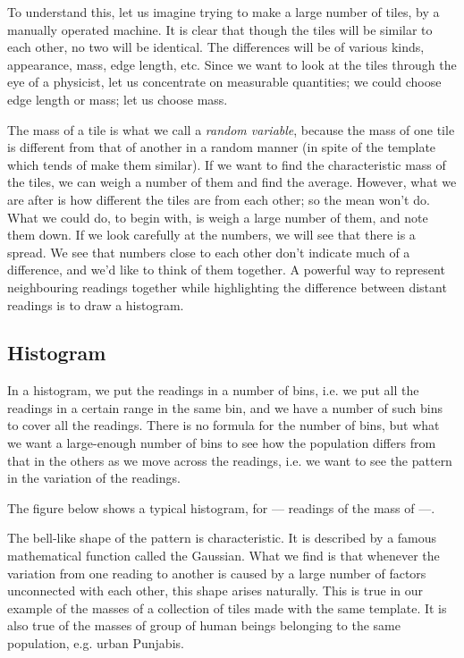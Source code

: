 To understand this, let us imagine trying to make a large number of tiles, by a manually operated machine. It is clear that though the tiles will be similar to each other, no two will be identical. The differences will be of various kinds, appearance, mass, edge length, etc. Since we want to look at the tiles through the eye of a physicist, let us concentrate on measurable quantities; we could choose edge length or mass; let us choose mass. 

The mass of a tile is what we call a \textit{random variable}, because the mass of one tile is different from that of another in a random manner (in spite of the template which tends of make them similar). If we want to find the characteristic mass of the tiles, we can weigh a number of them and find the average. However, what we are after is how different the tiles are from each other; so the mean won't do. What we could do, to begin with, is weigh a large number of them, and note them down. If we look carefully at the numbers, we will see that there is a spread. We see that numbers close to each other don't indicate much of a difference, and we'd like to think of them together. A powerful way to represent neighbouring readings together while highlighting the difference between distant readings is to draw a histogram. 
\subsection{Histogram}

In a histogram, we put the readings in a number of bins, i.e. we put all the readings in a certain range in the same bin, and we have a number of such bins to cover all the readings. There is no formula for the number of bins, but what we want a large-enough number of bins to see how the population differs from that in the others as we move across the readings, i.e. we want to see the pattern in the variation of the readings. 

The figure below shows a typical histogram, for --- readings of the mass of ---.

The bell-like shape of the pattern is characteristic. It is described by a famous mathematical function called the Gaussian. What we find is that whenever the variation from one reading to another is caused by a large number of factors unconnected with each other, this shape arises naturally. This is true in our example of the masses of a collection of tiles made with the same template. It is also true of the masses of group of human beings belonging to the same population, e.g. urban Punjabis. 

